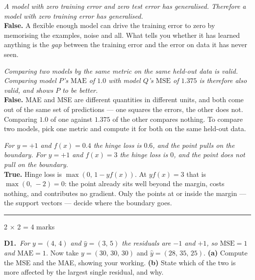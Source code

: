 \documentclass[10pt,a4paper]{article}
\newcommand{\parthead}[2]{\vspace{2pt}\noindent\rule{\linewidth}{0.4pt}\par\vspace{2pt}%
  \noindent{\bfseries Part #1}\hfill{\small #2}\par\vspace{1pt}}
\begin{document}
\begin{sC}

  \item \emph{\emph{A model with zero training error and zero test error has generalised.} Therefore a model with zero training error has generalised.}\\[2pt] \textbf{False.} A flexible enough model can drive the training error to zero by memorising the examples, noise and all. What tells you whether it has learned anything is the \emph{gap} between the training error and the error on data it has never seen.

  \item \emph{\emph{Comparing two models by the same metric on the same held-out data is valid.} Comparing model $P$'s $\mathrm{MAE}$ of $1.0$ with model $Q$'s $\mathrm{MSE}$ of $1.375$ is therefore also valid, and shows $P$ to be better.}\\[2pt] \textbf{False.} MAE and MSE are different quantities in different units, and both come out of the same set of predictions --- one squares the errors, the other does not. Comparing $1.0$ of one against $1.375$ of the other compares nothing. To compare two models, pick one metric and compute it for both on the same held-out data.

  \item \emph{\emph{For $y = +1$ and $f(x) = 0.4$ the hinge loss is $0.6$, and the point pulls on the boundary.} For $y = +1$ and $f(x) = 3$ the hinge loss is $0$, and the point does not pull on the boundary.}\\[2pt] \textbf{True.} Hinge loss is $\max(0,\,1 - y f(x))$. At $y f(x) = 3$ that is $\max(0,\,-2) = 0$: the point already sits well beyond the margin, costs nothing, and contributes no gradient. Only the points at or inside the margin --- the support vectors --- decide where the boundary goes.

\end{sC}

\newpage

\parthead{D --- Short answer}{2 $\times$ 2 = 4 marks}

\textbf{D1.}\ \emph{For $y = (4,\,4)$ and $\hat{y} = (3,\,5)$ the residuals are $-1$ and $+1$, so $\mathrm{MSE} = 1$ and $\mathrm{MAE} = 1$.} Now take $y = (30,\,30,\,30)$ and $\hat{y} = (28,\,35,\,25)$. \textbf{(a)} Compute the MSE and the MAE, showing your working. \textbf{(b)} State which of the two is more affected by the largest single residual, and why.

\vspace{2pt}
\end{document}
